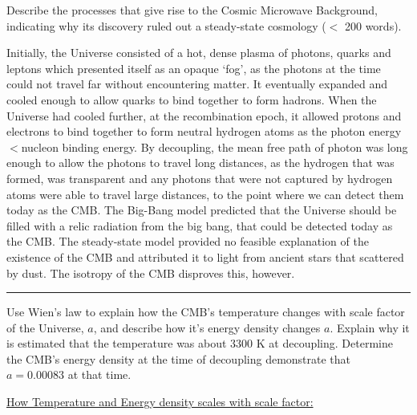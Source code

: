 \documentclass[11pt, a4paper, answers]{exam}
\begin{document}
\begin{questions}
    \question Describe the processes that give rise to the Cosmic Microwave Background, indicating why
    its discovery ruled out a steady-state cosmology ($<$ 200 words).

    \begin{solution}
        Initially, the Universe consisted of a hot, dense plasma of photons, quarks and leptons
        which presented itself as an opaque ‘fog’, as the photons at the time could not travel
        far without encountering matter. It eventually expanded and cooled enough to allow
        quarks to bind together to form hadrons. When the Universe had cooled further, at the
        recombination epoch, it allowed protons and electrons to bind together to form neutral
        hydrogen atoms as the photon energy$<$nucleon binding energy. By decoupling, the mean
        free path of photon was long enough to allow the photons to travel long distances, as
        the hydrogen that was formed, was transparent and any photons that were not captured
        by hydrogen atoms were able to travel large distances, to the point where we can detect
        them today as the CMB.
        \newline
        The Big-Bang model predicted that the Universe should be filled with a relic radiation
        from the big bang, that could be detected today as the CMB. The steady-state model provided
        no feasible explanation of the existence of the CMB and attributed it to light from ancient
        stars that scattered by dust. The isotropy of the CMB disproves this, however.

    \end{solution}



    \begin{center}
        \rule{8cm}{0.4pt}
    \end{center}
    \newpage


    \question Use Wien's law to explain how the CMB's temperature changes with scale factor of the
    Universe, $a$, and describe how it's energy density changes $a$. Explain why it is estimated
    that the temperature was about 3300 K at decoupling. Determine the CMB's energy density at the
    time of decoupling demonstrate that $a = 0.00083$ at that time.
    \begin{solution}

        \underline{How Temperature and Energy density scales with scale factor:}


\end{solution}
\end{questions}
\end{document}
